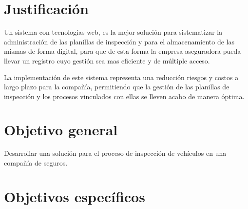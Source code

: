 \setlength{\parskip}{0mm}




\section{Justificación}


Un sistema con tecnologías web, es la mejor solución para sistematizar la administración de las planillas de inspección y para el almacenamiento de las mismas de forma digital, para que de esta forma la empresa aseguradora pueda llevar un registro cuyo gestión sea mas eficiente y de múltiple acceso.

La implementación de este sistema representa una reducción riesgos y costos a largo plazo para la compañía, permitiendo que la gestión de las planillas de inspección y los procesos vinculados con ellas se lleven acabo de manera óptima.


\section{Objetivo general}

Desarrollar una solución para el proceso de inspección de vehículos en una compañía de seguros.

\section{Objetivos específicos}

